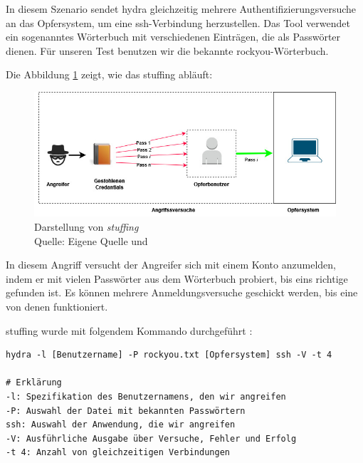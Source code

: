 In diesem Szenario sendet \gls{hydra} gleichzeitig mehrere Authentifizierungsversuche an das Opfersystem, um eine \gls{ssh}-Verbindung herzustellen. Das Tool verwendet ein sogenanntes Wörterbuch mit verschiedenen Einträgen, die als Passwörter dienen. Für unseren Test benutzen wir die bekannte \gls{rockyou}-Wörterbuch.

Die Abbildung \ref{fig:stuffing} zeigt, wie das \gls{stuffing} abläuft:
\begin{figure}[H]
   \centering
   \includegraphics[width=1\textwidth]{assets/Stuffing.jpg}
   \caption[Darstellung von \textit{\gls{stuffing}}]
   {Darstellung von \textit{\gls{stuffing}}\\Quelle: Eigene Quelle und \citep{Nguyen_stuffing}}
   \label{fig:stuffing}
   \centering
\end{figure}

In diesem Angriff versucht der Angreifer sich mit einem Konto anzumelden, indem er mit vielen Passwörter aus dem Wörterbuch probiert, bis eins richtige gefunden ist. Es können mehrere Anmeldungsversuche geschickt werden, bis eine von denen funktioniert.

\newpage
\gls{stuffing} wurde mit folgendem Kommando durchgeführt \citep{kali_hydra}:
{
\begin{Verbatim}[frame=single]
hydra -l [Benutzername] -P rockyou.txt [Opfersystem] ssh -V -t 4

# Erklärung
-l: Spezifikation des Benutzernamens, den wir angreifen
-P: Auswahl der Datei mit bekannten Passwörtern
ssh: Auswahl der Anwendung, die wir angreifen
-V: Ausführliche Ausgabe über Versuche, Fehler und Erfolg
-t 4: Anzahl von gleichzeitigen Verbindungen
\end{Verbatim}
}

